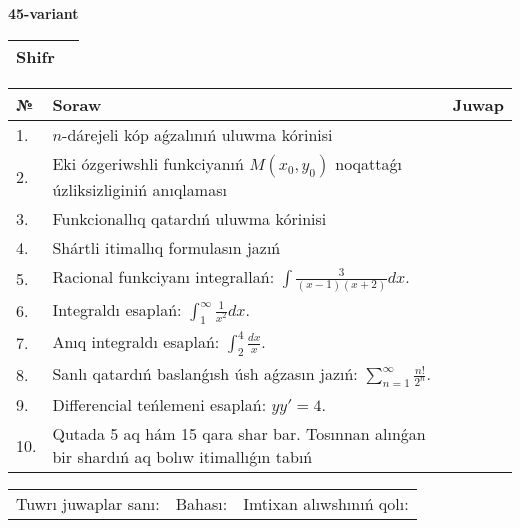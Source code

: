 \documentclass{article}
\begin{document}
  \egroup
  
  \newpage
  
  
  \textbf{45-variant}\\
  
  \bgroup
  \def\arraystretch{1.6} %
  
  \begin{tabular}{|m{5.7cm}|m{9.5cm}|}
  \hline
  Shifr & \\
  \hline
  \end{tabular}
  
  \vspace{1cm}
  
  \begin{tabular}{|m{0.7cm}|m{10cm}|m{4cm}|}
  \hline
  № & Soraw & Juwap \\
  \hline
  1. & \(n\)-dárejeli kóp aǵzalınıń uluwma kórinisi &  \\
  \hline
  2. & Eki ózgeriwshli funkciyanıń \(M(x_{0}, y_{0})\) noqattaǵı úzliksizliginiń anıqlaması &  \\
  \hline
  3. & Funkcionallıq qatardıń uluwma kórinisi &  \\
  \hline
  4. & Shártli itimallıq formulasın jazıń &  \\
  \hline
  5. & Racional funkciyanı integrallań: \(\int{\frac{3}{(x - 1)(x + 2)}dx}\). &  \\
  \hline
  6. & Integraldı esaplań: \(\int_{1}^{\infty}{\frac{1}{x^2 }dx}\). &  \\
  \hline
  7. & Anıq integraldı esaplań: \(\int_{2}^{4}\frac{dx}{x}\). &  \\
  \hline
  8. & Sanlı qatardıń baslanǵısh úsh aǵzasın jazıń: \(\sum_{n = 1}^{\infty}\frac{n!}{2^{n}}\). &  \\
  \hline
  9. & Differencial teńlemeni esaplań: \(yy' = 4\). &  \\
  \hline
  10. & Qutada 5 aq hám 15 qara shar bar. Tosınnan alınǵan bir shardıń aq bolıw itimallıǵın tabıń &  \\
  \hline
  \end{tabular}
  
  \vspace{1cm}
  
  \begin{tabular}{lll}
  Tuwrı juwaplar sanı: \underline{\hspace{1.5cm}} & 
  Bahası: \underline{\hspace{1.5cm}} & 
  Imtixan alıwshınıń qolı: \underline{\hspace{2cm}} \\
  \end{tabular}
  
\end{document}
